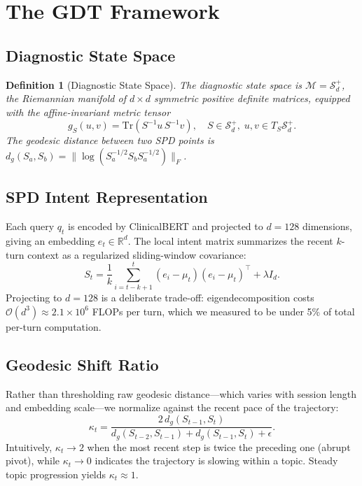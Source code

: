 \documentclass[review]{elsarticle}
\newtheorem{definition}{Definition}
\begin{document}
\section{The GDT Framework}
\label{sec:framework}

\subsection{Diagnostic State Space}

\begin{definition}[Diagnostic State Space]
\label{def:state_space}
The \emph{diagnostic state space} is $\mathcal{M} = \mathcal{S}_d^+$, the
Riemannian manifold of $d{\times}d$ symmetric positive definite matrices, equipped
with the affine-invariant metric tensor
\begin{equation}
  g_S(u, v) = \mathrm{Tr}(S^{-1} u\, S^{-1} v),
  \quad S \in \mathcal{S}_d^+,\; u,v \in T_S\mathcal{S}_d^+.
  \label{eq:metric_tensor}
\end{equation}
The geodesic distance between two SPD points is
$d_g(S_a, S_b) = \|\log(S_a^{-1/2} S_b S_a^{-1/2})\|_F$.
\end{definition}

\subsection{SPD Intent Representation}

Each query $q_t$ is encoded by ClinicalBERT and projected to $d{=}128$ dimensions,
giving an embedding $e_t \in \mathbb{R}^d$. The local intent matrix summarizes the
recent $k$-turn context as a regularized sliding-window covariance:
\begin{equation}
  S_t = \frac{1}{k}\sum_{i=t-k+1}^{t}(e_i-\mu_t)(e_i-\mu_t)^{\top} + \lambda I_d.
  \label{eq:spdintent}
\end{equation}
Projecting to $d{=}128$ is a deliberate trade-off: eigendecomposition costs
$\mathcal{O}(d^3) \approx 2.1{\times}10^6$ FLOPs per turn, which we measured to
be under 5\% of total per-turn computation.

\subsection{Geodesic Shift Ratio}

Rather than thresholding raw geodesic distance---which varies with session length
and embedding scale---we normalize against the recent pace of the trajectory:
\begin{equation}
  \kappa_t = \frac{2\,d_g(S_{t-1},S_t)}{d_g(S_{t-2},S_{t-1}) + d_g(S_{t-1},S_t) + \epsilon}.
  \label{eq:gsr}
\end{equation}
Intuitively, $\kappa_t \to 2$ when the most recent step is twice the preceding one
(abrupt pivot), while $\kappa_t \to 0$ indicates the trajectory is slowing within
a topic. Steady topic progression yields $\kappa_t \approx 1$.
\end{document}
